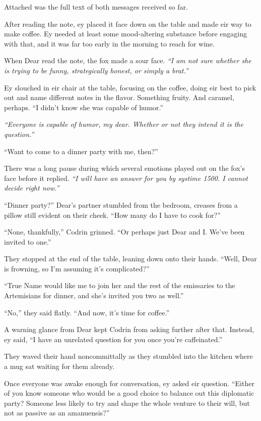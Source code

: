 Attached was the full text of both messages received so far.

After reading the note, ey placed it face down on the table and made eir way to make coffee. Ey needed at least some mood-altering substance before engaging with that, and it was far too early in the morning to reach for wine.

When Dear read the note, the fox made a sour face. \emph{``I am not sure whether she is trying to be funny, strategically honest, or simply a brat.''}

Ey slouched in eir chair at the table, focusing on the coffee, doing eir best to pick out and name different notes in the flavor. Something fruity. And caramel, perhaps. ``I didn't know she was capable of humor.''

\emph{``Everyone is capable of humor, my dear. Whether or not they intend it is the question.''}

``Want to come to a dinner party with me, then?''

There was a long pause during which several emotions played out on the fox's face before it replied. \emph{``I will have an answer for you by systime 1500. I cannot decide right now.''}

``Dinner party?'' Dear's partner stumbled from the bedroom, creases from a pillow still evident on their cheek. ``How many do I have to cook for?''

``None, thankfully,'' Codrin grinned. ``Or perhaps just Dear and I. We've been invited to one.''

They stopped at the end of the table, leaning down onto their hands. ``Well, Dear is frowning, so I'm assuming it's complicated?''

``True Name would like me to join her and the rest of the emissaries to the Artemisians for dinner, and she's invited you two as well.''

``No,'' they said flatly. ``And now, it's time for coffee.''

A warning glance from Dear kept Codrin from asking further after that. Instead, ey said, ``I have an unrelated question for you once you're caffeinated.''

They waved their hand noncommittally as they stumbled into the kitchen where a mug sat waiting for them already.

Once everyone was awake enough for conversation, ey asked eir question. ``Either of you know someone who would be a good choice to balance out this diplomatic party? Someone less likely to try and shape the whole venture to their will, but not as passive as an amanuensis?''


